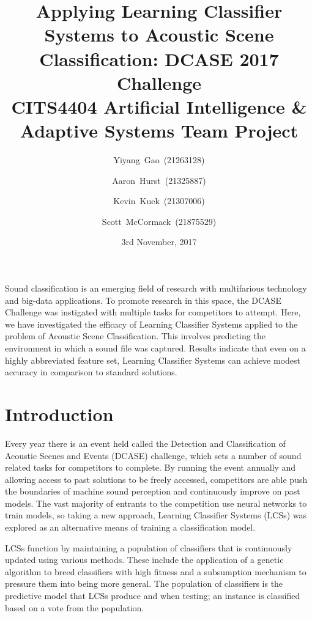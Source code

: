 \documentclass[11pt]{article}
\renewenvironment{abstract}
{\small
	\begin{center}
		\bfseries \abstractname\vspace{-.5em}\vspace{0pt}
	\end{center}
	\list{}{
		\setlength{\leftmargin}{.5cm}%
		\setlength{\rightmargin}{\leftmargin}%
	}%
	\item\relax}
{\endlist}
\begin{document}
\title{
	Applying Learning Classifier Systems to Acoustic Scene Classification: DCASE 2017 Challenge \\
	\vspace{0.2in}
	\large CITS4404 Artificial Intelligence \& Adaptive Systems Team Project
}
\author{Yiyang~Gao~(21263128)}
\author{Aaron~Hurst~(21325887)}
\author{Kevin~Kuek~(21307006)}
\author{Scott~McCormack~(21875529)}

\date{3rd November, 2017}

\maketitle

\begin{abstract}
	Sound classification is an emerging field of research with multifarious technology and big-data applications. To promote research in this space, the DCASE Challenge was instigated with multiple tasks for competitors to attempt. Here, we have investigated the efficacy of Learning Classifier Systems applied to the problem of Acoustic Scene Classification. This involves predicting the environment in which a sound file was captured. Results indicate that even on a highly abbreviated feature set, Learning Classifier Systems can achieve modest accuracy in comparison to standard solutions.
\end{abstract}



\section{Introduction}

Every year there is an event held called the Detection and Classification of Acoustic Scenes and Events (DCASE) challenge, which sets a number of sound related tasks for competitors to complete. By running the event annually and allowing access to past solutions to be freely accessed, competitors are able push the boundaries of machine sound perception and continuously improve on past models. The vast majority of entrants to the competition use neural networks to train models, so taking a new approach, Learning Classifier Systems (LCSs) was explored as an alternative means of training a classification model.

LCSs function by maintaining a population of classifiers that is continuously updated using various methods. These include the application of a genetic algorithm to breed classifiers with high fitness and a subsumption mechanism to pressure them into being more general. The population of classifiers is the predictive model that LCSs produce and when testing; an instance is classified based on a vote from the population.
\end{document}
